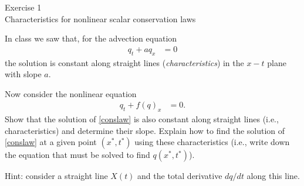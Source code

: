 \documentclass[12pt,english]{article}
\begin{document}
\begin{center}
{\large Exercise 1} \\
Characteristics for nonlinear scalar conservation laws
\par\end{center}{\large \par}

In class we saw that, for the advection equation
\begin{align}
q_t + a q_x & = 0
\end{align}
the solution is constant along straight lines ({\em characteristics})
in the $x-t$ plane with slope $a$.

Now consider the nonlinear equation
\begin{align} \label{conslaw}
q_t + f(q)_x & = 0.
\end{align}
Show that the solution of \eqref{conslaw} is also constant along straight
lines (i.e., characteristics) and determine their slope.  Explain how
to find the solution of \eqref{conslaw} at a given point $(x^*,t^*)$
using these characteristics (i.e., write down the equation that must be solved
to find $q(x^*,t^*)$).

Hint: consider a straight line $X(t)$ and the total derivative $dq/dt$ along this line.
\end{document}
